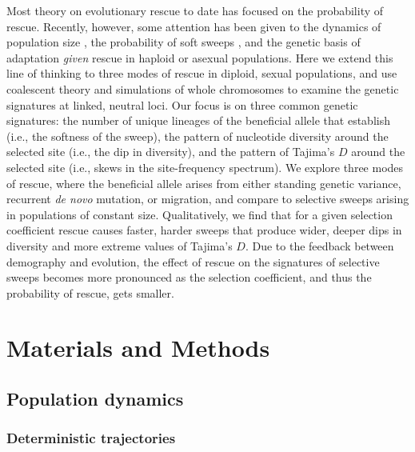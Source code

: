 \documentclass[]{article}
\begin{document}
Most theory on evolutionary rescue to date \citep[reviewed in][]{alexander2014evolutionary} has focused on the probability of rescue.
Recently, however, some attention has been given to the dynamics of population size \citep{orr2014population}, the probability of soft sweeps \citep{wilson2017soft}, and the genetic basis of adaptation \citep{osmond2020genetic} \textit{given} rescue in haploid or asexual populations.
Here we extend this line of thinking to three modes of rescue in diploid, sexual populations, and use coalescent theory and simulations of whole chromosomes to examine the genetic signatures at linked, neutral loci.
Our focus is on three common genetic signatures: the number of unique lineages of the beneficial allele that establish (i.e., the softness of the sweep), the pattern of nucleotide diversity around the selected site (i.e., the dip in diversity), and the pattern of Tajima's $D$ around the selected site (i.e., skews in the site-frequency spectrum).
We explore three modes of rescue, where the beneficial allele arises from either standing genetic variance, recurrent \textit{de novo} mutation, or migration, and compare to selective sweeps arising in populations of constant size.
Qualitatively, we find that for a given selection coefficient rescue causes faster, harder sweeps that produce wider, deeper dips in diversity and more extreme values of Tajima's $D$.
Due to the feedback between demography and evolution, the effect of rescue on the signatures of selective sweeps becomes more pronounced as the selection coefficient, and thus the probability of rescue, gets smaller.

\section*{Materials and Methods}
\label{sec:methods}

\subsection*{Population dynamics}

\subsubsection*{Deterministic trajectories}
\label{sec:rescue_forward}
\end{document}
